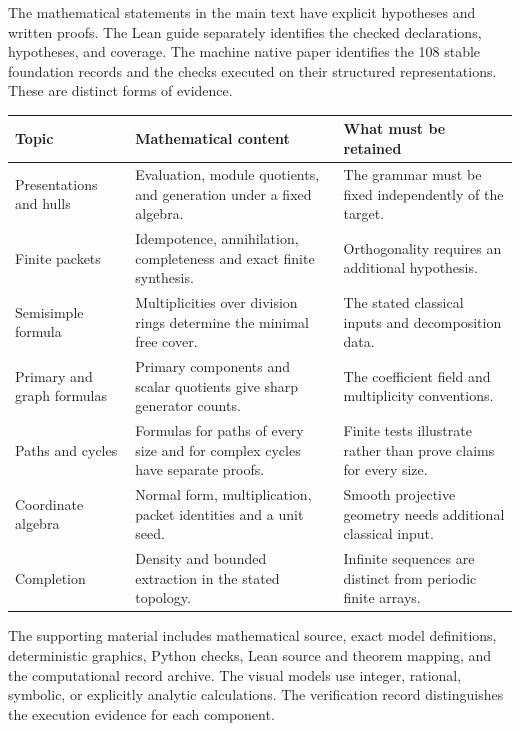 
The mathematical statements in the main text have explicit hypotheses and written proofs. The Lean guide separately identifies the checked declarations, hypotheses, and coverage. The machine native paper identifies the 108 stable foundation records and the checks executed on their structured representations. These are distinct forms of evidence.

{\small\begin{tabularx}{\linewidth}{@{}>{\raggedright\arraybackslash}p{.23\linewidth}Y>{\raggedright\arraybackslash}p{.25\linewidth}@{}}\toprule
\textbf{Topic} & \textbf{Mathematical content} & \textbf{What must be retained}\\\midrule
Presentations and hulls & Evaluation, module quotients, and generation under a fixed algebra. & The grammar must be fixed independently of the target.\\
Finite packets & Idempotence, annihilation, completeness and exact finite synthesis. & Orthogonality requires an additional hypothesis.\\
Semisimple formula & Multiplicities over division rings determine the minimal free cover. & The stated classical inputs and decomposition data.\\
Primary and graph formulas & Primary components and scalar quotients give sharp generator counts. & The coefficient field and multiplicity conventions.\\
Paths and cycles & Formulas for paths of every size and for complex cycles have separate proofs. & Finite tests illustrate rather than prove claims for every size.\\
Coordinate algebra & Normal form, multiplication, packet identities and a unit seed. & Smooth projective geometry needs additional classical input.\\
Completion & Density and bounded extraction in the stated topology. & Infinite sequences are distinct from periodic finite arrays.\\\bottomrule\end{tabularx}}

The supporting material includes mathematical source, exact model definitions, deterministic graphics, Python checks, Lean source and theorem mapping, and the computational record archive. The visual models use integer, rational, symbolic, or explicitly analytic calculations. The verification record distinguishes the execution evidence for each component.

